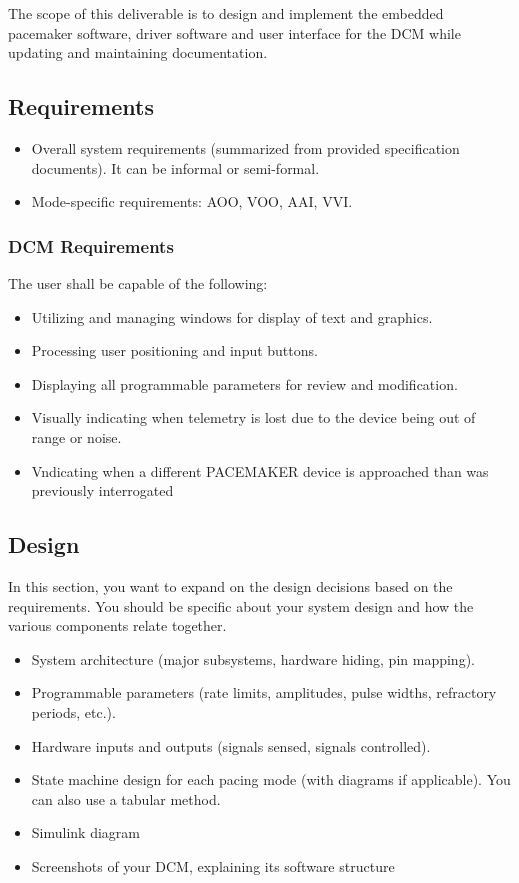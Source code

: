\documentclass{article}
\begin{document}
The scope of this deliverable is to design and implement the embedded pacemaker software, driver software and user interface for 
the DCM while updating and maintaining documentation. 



\subsection{Requirements}

\begin{itemize}
    \item Overall system requirements (summarized from provided specification documents). It can be informal or semi-formal.
    \item Mode-specific requirements: AOO, VOO, AAI, VVI.
\end{itemize}

\subsubsection{DCM Requirements}
The user shall be capable of the following:
\begin{itemize}
    \item Utilizing and managing windows for display of text and graphics.
    \item Processing user positioning and input buttons.
    \item Displaying all programmable parameters for review and modification.
    \item Visually indicating when telemetry is lost due to the device being out of range or noise.
    \item Vndicating when a different PACEMAKER device is approached than was previously interrogated
\end{itemize}


\subsection{Design}
\label{dessec}
In this section, you want to expand on the design decisions based on the requirements. You should be specific about your system design and how the various components relate together.

\begin{itemize}
    \item System architecture (major subsystems, hardware hiding, pin mapping).
    \item Programmable parameters (rate limits, amplitudes, pulse widths, refractory periods, etc.).
    \item Hardware inputs and outputs (signals sensed, signals controlled).
    \item State machine design for each pacing mode (with diagrams if applicable). You can also use a tabular method.
    \item Simulink diagram
    \item Screenshots of your DCM, explaining its software structure
\end{itemize}
\end{document}
